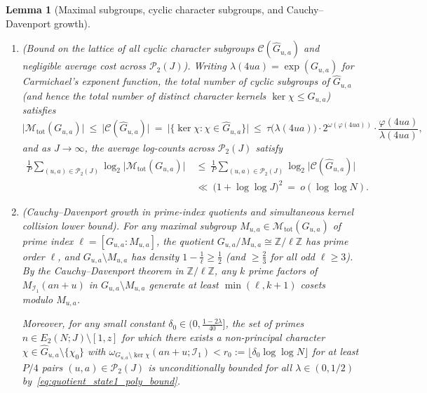\documentclass[11pt, a4paper]{article}
\theoremstyle{plain}
\newtheorem{lemma}[theorem]{Lemma}
\theoremstyle{definition}
\newcommand{\Z}{\mathbb{Z}}
\begin{document}
\begin{lemma}[Maximal subgroups, cyclic character subgroups, and Cauchy--Davenport growth]
\begin{enumerate}[label=(\alph*)]
    \item \emph{(Bound on the lattice of all cyclic character subgroups $\mathcal{C}(\widehat{G}_{u,a})$ and negligible average cost across $\mathcal{P}_2(J)$).} 
    Writing $\lambda(4ua)=\exp(G_{u,a})$ for Carmichael's exponent function, the total number of cyclic subgroups of $\widehat{G}_{u,a}$ (and hence the total number of distinct character kernels $\ker\chi\le G_{u,a}$) satisfies
    \begin{equation}\label{eq:C_cyclic_upper_bound}
    \big|\mathcal{M}_{\mathrm{tot}}(G_{u,a})\big|\ \le\ \big|\mathcal{C}(\widehat{G}_{u,a})\big|\ =\ \big|\{\ker\chi:\chi\in\widehat{G}_{u,a}\}\big|\ \le\ \tau\big(\lambda(4ua)\big)\cdot 2^{\omega(\varphi(4ua))}\cdot\frac{\varphi(4ua)}{\lambda(4ua)},
    \end{equation}
    and as $J\to\infty$, the average log-counts across $\mathcal{P}_2(J)$ satisfy
    \begin{equation}\label{eq:Mtot_average_bound}
    \begin{split}
    \frac1P\sum_{(u,a)\in\mathcal{P}_2(J)}\log_2\big|\mathcal{M}_{\mathrm{tot}}(G_{u,a})\big|\ &\le\ \frac1P\sum_{(u,a)\in\mathcal{P}_2(J)}\log_2\big|\mathcal{C}(\widehat{G}_{u,a})\big|\\
    &\ll\ \big(1+\log\log J\big)^{2}\ =\ o(\log\log N).
    \end{split}
    \end{equation}
    
    \item \emph{(Cauchy--Davenport growth in prime-index quotients and simultaneous kernel collision lower bound).} 
    For any maximal subgroup $M_{u,a}\in\mathcal{M}_{\mathrm{tot}}(G_{u,a})$ of prime index $\ell=[G_{u,a}:M_{u,a}]$, the quotient $G_{u,a}/M_{u,a}\cong\Z/\ell\Z$ has prime order $\ell$, and $G_{u,a}\setminus M_{u,a}$ has density $1-\frac1\ell\ge\frac12$ (and $\ge\frac23$ for all odd $\ell\ge3$). By the Cauchy--Davenport theorem in $\Z/\ell\Z$, any $k$ prime factors of $M_{\mathcal{I}_1}(an+u)$ in $G_{u,a}\setminus M_{u,a}$ generate at least $\min(\ell,k+1)$ cosets modulo $M_{u,a}$. 
    
    Moreover, for any small constant $\delta_0\in(0,\frac{1-2\lambda}{40}]$, the set of primes $n\in E_2(N;J)\setminus[1,z]$ for which there exists a non-principal character $\chi\in\widehat{G}_{u,a}\setminus\{\chi_0\}$ with $\omega_{G_{u,a}\setminus\ker\chi}(an+u;\mathcal{I}_1)<\allowbreak r_0:=\allowbreak\lfloor\delta_0\log\log N\rfloor$ for at least $P/4$ pairs $(u,a)\in\mathcal{P}_2(J)$ is unconditionally bounded for all $\lambda\in(0,1/2)$ by~\eqref{eq:quotient_state1_poly_bound}.
\end{enumerate}
\end{lemma}
\end{document}
